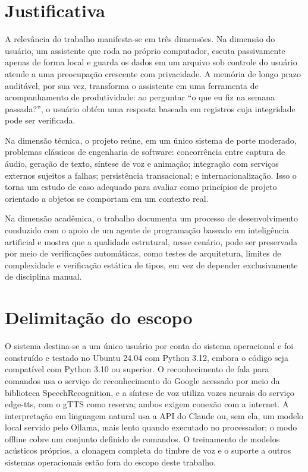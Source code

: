\section{Justificativa}

A relevância do trabalho manifesta-se em três dimensões. Na dimensão do usuário, um assistente que
roda no próprio computador, escuta passivamente apenas de forma local e guarda os dados em um arquivo
sob controle do usuário atende a uma preocupação crescente com privacidade. A memória de longo prazo
auditável, por sua vez, transforma o assistente em uma ferramenta de acompanhamento de produtividade:
ao perguntar “o que eu fiz na semana passada?”, o usuário obtém uma resposta baseada em registros
cuja integridade pode ser verificada.

Na dimensão técnica, o projeto reúne, em um único sistema de porte moderado, problemas clássicos de
engenharia de software: concorrência entre captura de áudio, geração de texto, síntese de voz e
animação; integração com serviços externos sujeitos a falhas; persistência transacional; e
internacionalização. Isso o torna um estudo de caso adequado para avaliar como princípios de projeto
orientado a objetos se comportam em um contexto real.

Na dimensão acadêmica, o trabalho documenta um processo de desenvolvimento conduzido com o apoio de
um agente de programação baseado em inteligência artificial e mostra que a qualidade estrutural, nesse
cenário, pode ser preservada por meio de verificações automáticas, como testes de arquitetura, limites
de complexidade e verificação estática de tipos, em vez de depender exclusivamente de disciplina
manual.

\section{Delimitação do escopo}

O sistema destina-se a um único usuário por conta do sistema operacional e foi construído e testado
no Ubuntu 24.04 com Python 3.12, embora o código seja compatível com Python 3.10 ou superior. O
reconhecimento de fala para comandos usa o serviço de reconhecimento do Google acessado por meio da
biblioteca SpeechRecognition, e a síntese de voz utiliza vozes neurais do serviço edge-tts, com o gTTS
como reserva; ambos exigem conexão com a internet. A interpretação em linguagem natural usa a API do
Claude ou, sem ela, um modelo local servido pelo Ollama, mais lento quando executado no processador; o
modo offline cobre um conjunto definido de comandos. O treinamento de
modelos acústicos próprios, a clonagem completa do timbre de voz e o suporte a outros sistemas
operacionais estão fora do escopo deste trabalho.

